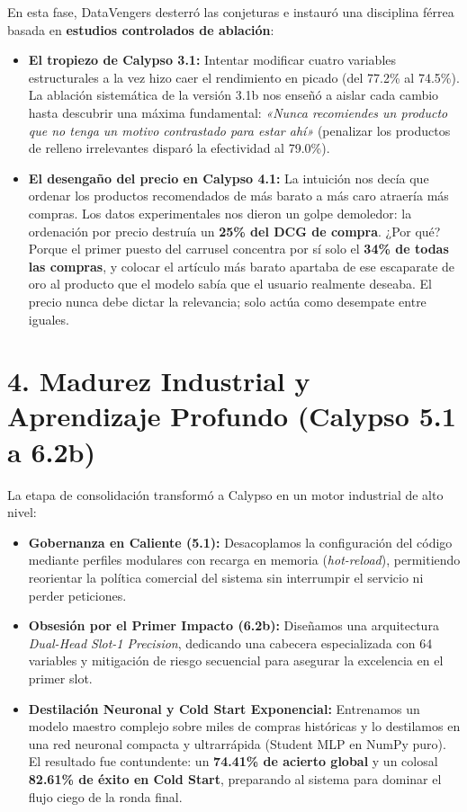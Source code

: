 \documentclass[11pt,a4paper]{article}
\begin{document}
En esta fase, DataVengers desterró las conjeturas e instauró una disciplina férrea basada en \textbf{estudios controlados de ablación}:
\begin{itemize}
    \item \textbf{El tropiezo de Calypso 3.1:} Intentar modificar cuatro variables estructurales a la vez hizo caer el rendimiento en picado (del 77.2\% al 74.5\%). La ablación sistemática de la versión 3.1b nos enseñó a aislar cada cambio hasta descubrir una máxima fundamental: \textit{«Nunca recomiendes un producto que no tenga un motivo contrastado para estar ahí»} (penalizar los productos de relleno irrelevantes disparó la efectividad al 79.0\%).
    \item \textbf{El desengaño del precio en Calypso 4.1:} La intuición nos decía que ordenar los productos recomendados de más barato a más caro atraería más compras. Los datos experimentales nos dieron un golpe demoledor: la ordenación por precio destruía un \textbf{25\% del DCG de compra}. ¿Por qué? Porque el primer puesto del carrusel concentra por sí solo el \textbf{34\% de todas las compras}, y colocar el artículo más barato apartaba de ese escaparate de oro al producto que el modelo sabía que el usuario realmente deseaba. El precio nunca debe dictar la relevancia; solo actúa como desempate entre iguales.
\end{itemize}

\section{4. Madurez Industrial y Aprendizaje Profundo (Calypso 5.1 a 6.2b)}

La etapa de consolidación transformó a Calypso en un motor industrial de alto nivel:
\begin{itemize}[noitemsep]
    \item \textbf{Gobernanza en Caliente (5.1):} Desacoplamos la configuración del código mediante perfiles modulares con recarga en memoria (\textit{hot-reload}), permitiendo reorientar la política comercial del sistema sin interrumpir el servicio ni perder peticiones.
    \item \textbf{Obsesión por el Primer Impacto (6.2b):} Diseñamos una arquitectura \textit{Dual-Head Slot-1 Precision}, dedicando una cabecera especializada con 64 variables y mitigación de riesgo secuencial para asegurar la excelencia en el primer slot.
    \item \textbf{Destilación Neuronal y Cold Start Exponencial:} Entrenamos un modelo maestro complejo sobre miles de compras históricas y lo destilamos en una red neuronal compacta y ultrarrápida (Student MLP en NumPy puro). El resultado fue contundente: un \textbf{74.41\% de acierto global} y un colosal \textbf{82.61\% de éxito en Cold Start}, preparando al sistema para dominar el flujo ciego de la ronda final.
\end{itemize}
\end{document}
